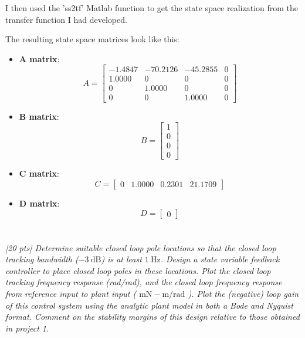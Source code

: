 \documentclass{article}
\begin{document}
I then used the 'ss2tf' Matlab function to get the state space realization from the transfer function I had developed.

The resulting state space matrices look like this:

\begin{itemize}
    \item \textbf{A matrix}:
    \[
    A = \begin{bmatrix}
        -1.4847 & -70.2126 & -45.2855 & 0 \\
        1.0000 & 0 & 0 & 0 \\
        0 & 1.0000 & 0 & 0 \\
        0 & 0 & 1.0000 & 0
    \end{bmatrix}
    \]
    
    \item \textbf{B matrix}:
    \[
    B = \begin{bmatrix}
        1 \\
        0 \\
        0 \\
        0
    \end{bmatrix}
    \]
    
    \item \textbf{C matrix}:
    \[
    C = \begin{bmatrix}
        0 & 1.0000 & 0.2301 & 21.1709
    \end{bmatrix}
    \]
    
    \item \textbf{D matrix}:
    \[
    D = \begin{bmatrix}
        0
    \end{bmatrix}
    \]
\end{itemize}

\section{}
\textit{[20 pts] Determine suitable closed loop pole locations so that the closed loop tracking bandwidth ($-3 \mathrm{~dB}$) is at least $1 \mathrm{~Hz}$. Design a state variable feedback controller to place closed loop poles in these locations. Plot the closed loop tracking frequency response (rad/rad), and the closed loop frequency response from reference input to plant input ( $\mathrm{mN}-\mathrm{m} / \mathrm{rad}$ ). Plot the (negative) loop gain of this control system using the analytic plant model in both a Bode and Nyquist format. Comment on the stability margins of this design relative to those obtained in project 1.}
\end{document}
